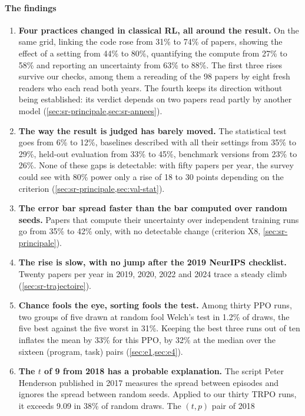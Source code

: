 \paragraph{The findings}
\begin{enumerate}
  \item \textbf{Four practices changed in classical RL, all around the result.} On the same grid,
  linking the code rose from 31\% to 74\% of papers, showing the effect of a setting from 44\% to
  80\%, quantifying the compute from 27\% to 58\% and reporting an uncertainty from 63\% to 88\%. The
  first three rises survive our checks, among them a rereading of the 98 papers by eight fresh readers
  who each read both years. The fourth keeps its direction without being established: its verdict
  depends on two papers read partly by another model (\cref{sec:sr-principale,sec:sr-annees}).
  \item \textbf{The way the result is judged has barely moved.} The statistical test goes from 6\% to
  12\%, baselines described with all their settings from 35\% to 29\%, held-out evaluation from 33\%
  to 45\%, benchmark versions from 23\% to 26\%. None of these gaps is detectable: with fifty papers
  per year, the survey could see with 80\% power only a rise of 18 to 30 points depending on the
  criterion (\cref{sec:sr-principale,sec:val-stat}).
  \item \textbf{The error bar spread faster than the bar computed over random seeds.} Papers that
  compute their uncertainty over independent training runs go from 35\% to 42\% only, with no
  detectable change (criterion X8, \cref{sec:sr-principale}).
  \item \textbf{The rise is slow, with no jump after the 2019 NeurIPS checklist.} Twenty papers per
  year in 2019, 2020, 2022 and 2024 trace a steady climb (\cref{sec:sr-trajectoire}).
  \item \textbf{Chance fools the eye, sorting fools the test.} Among thirty PPO runs, two groups of
  five drawn at random fool Welch's test in 1.2\% of draws, the five best against the five worst in
  31\%. Keeping the best three runs out of ten inflates the mean by 33\% for this PPO, by 32\% at the
  median over the sixteen (program, task) pairs (\cref{sec:e1,sec:e4}).
  \item \textbf{The $t$ of 9 from 2018 has a probable explanation.} The script Peter Henderson
  published in 2017 measures the spread between episodes and ignores the spread between random seeds.
  Applied to our thirty TRPO runs, it exceeds 9.09 in 38\% of random draws. The $(t, p)$ pair of 2018

\end{enumerate}
